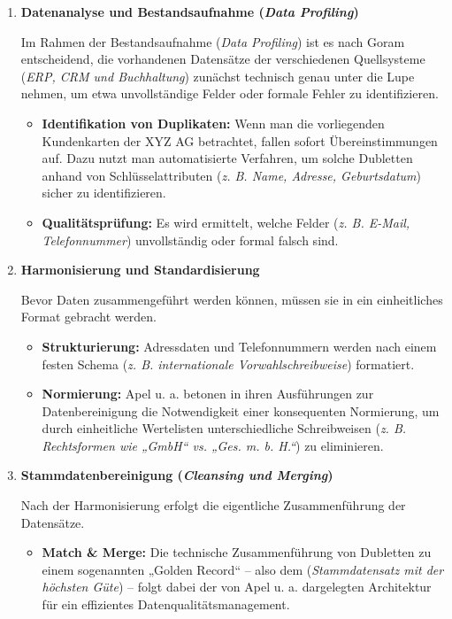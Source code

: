 \begin{enumerate}[label=\arabic*.), leftmargin=*]
    \item \textbf{Datenanalyse und Bestandsaufnahme (\textit{Data Profiling})} \par Im Rahmen der Bestandsaufnahme (\textit{Data Profiling}) ist es nach Goram \cite[72]{22} entscheidend, die vorhandenen Datensätze der verschiedenen Quellsysteme (\textit{\acs{ERP}, \acs{CRM} und Buchhaltung}) zunächst technisch genau unter die Lupe nehmen, um etwa unvollständige Felder oder formale Fehler zu identifizieren.
    \begin{itemize}
        \item \textbf{Identifikation von Duplikaten:} Wenn man die vorliegenden Kundenkarten der XYZ AG betrachtet, fallen sofort Übereinstimmungen auf. Dazu nutzt man automatisierte Verfahren, um solche Dubletten anhand von Schlüsselattributen (\textit{\acs{z. B.} Name, Adresse, Geburtsdatum}) sicher zu identifizieren.
        \item \textbf{Qualitätsprüfung:} Es wird ermittelt, welche Felder (\textit{\acs{z. B.} E-Mail, Telefonnummer}) unvollständig oder formal falsch sind.
    \end{itemize}
    \item \textbf{Harmonisierung und Standardisierung} \par Bevor Daten zusammengeführt werden können, müssen sie in ein einheitliches Format gebracht werden.
    \begin{itemize}
        \item \textbf{Strukturierung:} Adressdaten und Telefonnummern werden nach einem festen Schema (\textit{\acs{z. B.} internationale Vorwahlschreibweise}) formatiert.
        \item \textbf{Normierung:} Apel \acs{u. a.} \cite[187]{23} betonen in ihren Ausführungen zur Datenbereinigung die Notwendigkeit einer konsequenten Normierung, um durch einheitliche Wertelisten unterschiedliche Schreibweisen (\textit{\acs{z. B.} Rechtsformen wie „GmbH“ \acs{vs.} „Ges. m. b. H.“}) zu eliminieren.
    \end{itemize}
    \item \textbf{Stammdatenbereinigung (\textit{Cleansing und Merging})} \par Nach der Harmonisierung erfolgt die eigentliche Zusammenführung der Datensätze.
    \begin{itemize}
        \item \textbf{Match \& Merge:} Die technische Zusammenführung von Dubletten zu einem sogenannten „Golden Record“ – also dem (\textit{Stammdatensatz mit der höchsten Güte}) – folgt dabei der von Apel u. a. \cite[81]{24} dargelegten Architektur für ein effizientes Datenqualitätsmanagement.

\end{itemize}
\end{enumerate}

